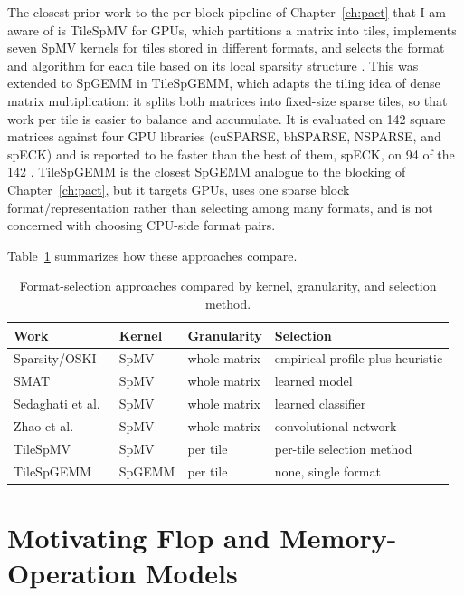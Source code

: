 The closest prior work to the per-block pipeline of Chapter~\ref{ch:pact} that I am aware of is TileSpMV for GPUs, which
partitions a matrix into tiles, implements seven SpMV kernels for tiles stored in different formats, and selects the format
and algorithm for each tile based on its local sparsity structure \cite{niu2021tilespmv}. This was extended to SpGEMM in TileSpGEMM, which adapts the
tiling idea of dense matrix multiplication: it splits both matrices into fixed-size sparse tiles, so that work per tile is easier to balance and accumulate.
It is evaluated on 142 square matrices against four GPU libraries (cuSPARSE, bhSPARSE, NSPARSE, and spECK) and is reported to be faster than the best of
them, spECK, on 94 of the 142 \cite{niu2022tilespgemm}. TileSpGEMM is the closest SpGEMM analogue to the blocking of Chapter~\ref{ch:pact}, but it targets GPUs,
uses one sparse block format/representation rather than selecting among many formats, and is not concerned with choosing CPU-side format pairs.

Table~\ref{tab:lit-formats} summarizes how these approaches compare.

\begin{table}[h]
\centering
\small
\begin{tabular}{p{3.0cm}p{1.6cm}p{2.6cm}p{4.6cm}}
\hline
\textbf{Work} & \textbf{Kernel} & \textbf{Granularity} & \textbf{Selection} \\
\hline
Sparsity/OSKI \cite{vuduc2003thesis} & SpMV & whole matrix & empirical profile plus heuristic \\
SMAT \cite{li2013smat} & SpMV & whole matrix & learned model \\
Sedaghati et al.\ \cite{sedaghati2015automatic} & SpMV & whole matrix & learned classifier \\
Zhao et al.\ \cite{zhao2018bridging} & SpMV & whole matrix & convolutional network \\
TileSpMV \cite{niu2021tilespmv} & SpMV & per tile & per-tile selection method \\
TileSpGEMM \cite{niu2022tilespgemm} & SpGEMM & per tile & none, single format \\
\hline
\end{tabular}
\caption{Format-selection approaches compared by kernel, granularity, and selection method.}
\label{tab:lit-formats}
\end{table}

\section{Motivating Flop and Memory-Operation Models}
\label{sec:lit-models}


